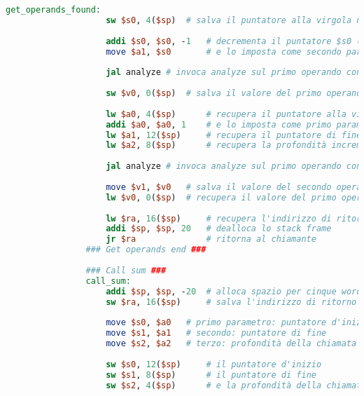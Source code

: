 \begin{center}
\begin{lstlisting}[language=mips, gobble=14, stepnumber=1]
                get_operands_found:
                    sw $s0, 4($sp)  # salva il puntatore alla virgola nello stack
                    
                    addi $s0, $s0, -1   # decrementa il puntatore $s0 (carattere subito prima della virgola)
                    move $a1, $s0       # e lo imposta come secondo parametro per analyze
                    
                    jal analyze # invoca analyze sul primo operando con profondità incrementata di 1
                    
                    sw $v0, 0($sp)  # salva il valore del primo operando nello stack
                    
                    lw $a0, 4($sp)      # recupera il puntatore alla virgola
                    addi $a0, $a0, 1    # e lo imposta come primo parametro (puntatore d'inizio) incrementandolo di 1 (primo carattere dopo la virgola)
                    lw $a1, 12($sp)     # recupera il puntatore di fine
                    lw $a2, 8($sp)      # recupera la profondità incrementata di 1
                    
                    jal analyze # invoca analyze sul primo operando con profondità incrementata di 1
                    
                    move $v1, $v0   # salva il valore del secondo operando come secondo risultato
                    lw $v0, 0($sp)  # recupera il valore del primo operando e lo imposta come primo risultato
                    
                    lw $ra, 16($sp)     # recupera l'indirizzo di ritorno
                    addi $sp, $sp, 20   # dealloca lo stack frame
                    jr $ra              # ritorna al chiamante
                ### Get operands end ###
                
                ### Call sum ###
                call_sum:
                    addi $sp, $sp, -20  # alloca spazio per cinque words nello stack frame
                    sw $ra, 16($sp)     # salva l'indirizzo di ritorno nello stack
                    
                    move $s0, $a0   # primo parametro: puntatore d'inizio
                    move $s1, $a1   # secondo: puntatore di fine
                    move $s2, $a2   # terzo: profondità della chiamata
                    
                    sw $s0, 12($sp)     # il puntatore d'inizio
                    sw $s1, 8($sp)      # il puntatore di fine
                    sw $s2, 4($sp)      # e la profondità della chiamata
                    

\end{lstlisting}
\end{center}
